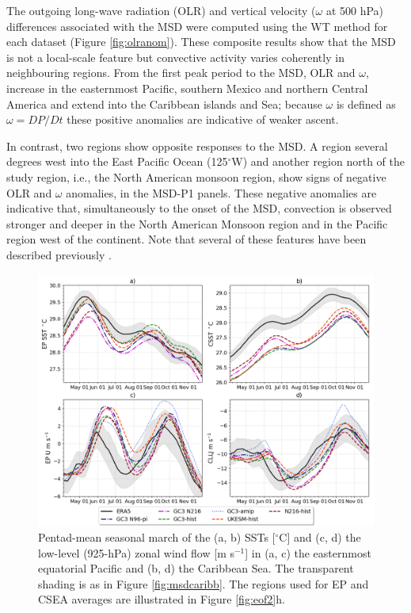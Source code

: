  The outgoing long-wave radiation (OLR) and vertical velocity ($\omega$ at 500 hPa) differences associated with the MSD were computed using the WT method for each dataset (Figure \ref{fig:olranom}). These composite results show that the MSD is not a local-scale feature but convective activity varies coherently in neighbouring regions. From the first peak period to the MSD, OLR and $\omega$, increase in the easternmost Pacific, southern Mexico and northern Central America and extend into the Caribbean islands and Sea; because $\omega$ is defined as $\omega=DP/Dt$  these positive anomalies are indicative of weaker ascent. 
 
 In contrast, two regions show opposite responses to the MSD. A region several degrees west into the East Pacific Ocean (125$^\circ$W) and another region north of the study region, i.e., the North American monsoon region, show signs of negative OLR and $\omega$ anomalies, in the MSD-P1 panels. These negative anomalies are indicative that, simultaneously to the onset of the MSD,  convection is observed stronger and deeper in the North American Monsoon region and in the Pacific region west of the continent. Note that several of these features have been described previously \cite{herrera2015}. 
 
 \begin{figure}[t!]
\includegraphics[width=\linewidth]{figures/index_seasonal}
\caption[Seasonal cycle of East Pacific and Caribbean SSTs and zonal winds.]{Pentad-mean seasonal march of the (a, b) SSTs [$^\circ$C] and (c, d) the low-level (925-hPa) zonal wind flow [m s$^{-1}$] in (a, c) the easternmost equatorial Pacific and (b, d) the Caribbean Sea. The transparent shading is as in Figure \ref{fig:msdcaribb}. The regions used for EP and CSEA averages are illustrated in Figure \ref{fig:eof2}h.}
\label{fig:csst}
\end{figure}
 
